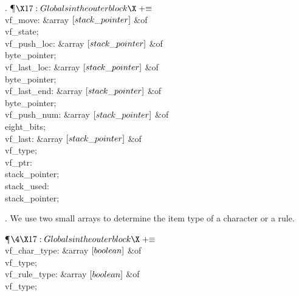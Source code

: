 . \P$\X17:Globals in the outer block\X\mathrel{+}\S$\6
\4\\{vf\_move}: \&{array} $[\\{stack\_pointer}]$ \1\&{of}\5
\\{vf\_state};\2\6
\4\\{vf\_push\_loc}: \&{array} $[\\{stack\_pointer}]$ \1\&{of}\5
\\{byte\_pointer};\2\6
\4\\{vf\_last\_loc}: \&{array} $[\\{stack\_pointer}]$ \1\&{of}\5
\\{byte\_pointer};\2\6
\4\\{vf\_last\_end}: \&{array} $[\\{stack\_pointer}]$ \1\&{of}\5
\\{byte\_pointer};\2\6
\4\\{vf\_push\_num}: \&{array} $[\\{stack\_pointer}]$ \1\&{of}\5
\\{eight\_bits};\2\6
\4\\{vf\_last}: \&{array} $[\\{stack\_pointer}]$ \1\&{of}\5
\\{vf\_type};\2\6
\4\\{vf\_ptr}: \\{stack\_pointer};\6
\4\\{stack\_used}: \\{stack\_pointer};\par
\fi

. We use two small arrays to determine the item type of a character or a
rule.

\Y\P$\4\X17:Globals in the outer block\X\mathrel{+}\S$\6
\4\\{vf\_char\_type}: \&{array} $[\\{boolean}]$ \1\&{of}\5
\\{vf\_type};\2\6
\4\\{vf\_rule\_type}: \&{array} $[\\{boolean}]$ \1\&{of}\5
\\{vf\_type};\2\par
\fi

